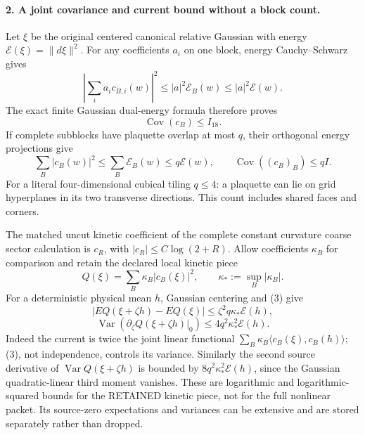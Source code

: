 \documentclass[11pt]{article}
\begin{document}
\paragraph{2. A joint covariance and current bound without a block count.}
Let $\xi$ be the original centered canonical relative Gaussian with
energy $\mathcal E(\xi)=\|d\xi\|^2$. For any coefficients $a_i$ on one
block, energy Cauchy--Schwarz gives
\[
 |\sum_i a_i c_{B,i}(w)|^2
       \le |a|^2\mathcal E_B(w)\le |a|^2\mathcal E(w).
\]
The exact finite Gaussian dual-energy formula therefore proves
\[
 \operatorname{Cov}(c_B)\le I_{18}.                              \tag{2}
\]
If complete subblocks have plaquette overlap at most $q$, their
orthogonal energy projections give
\[
 \sum_B|c_B(w)|^2\le\sum_B\mathcal E_B(w)\le q\mathcal E(w),
 \qquad \operatorname{Cov}((c_B)_B)\le q I.                      \tag{3}
\]
For a literal four-dimensional cubical tiling $q\le4$: a plaquette can
lie on grid hyperplanes in its two transverse directions. This count
includes shared faces and corners.

The matched uncut kinetic coefficient of the complete constant curvature coarse sector calculation is $c_R$, with
$|c_R|\le C\log(2+R)$. Allow coefficients $\kappa_B$ for comparison and retain
the declared local kinetic piece
\[
 Q(\xi)=\sum_B \kappa_B|c_B(\xi)|^2,\qquad
 \kappa_*:=\sup_B|\kappa_B|.
\]
For a deterministic physical mean $h$,
Gaussian centering and (3) give
\[
 |E Q(\xi+\zeta h)-E Q(\xi)|\le \zeta^2 q \kappa_*\mathcal E(h),
\]
\[
 \operatorname{Var}\left(\partial_\zeta Q(\xi+\zeta h)|_0\right)
              \le4q^2\kappa_*^2\mathcal E(h).                         \tag{4}
\]
Indeed the current is twice the joint linear functional
$\sum_B\kappa_B\langle c_B(\xi),c_B(h)\rangle$; (3), not independence,
controls its variance. Similarly the second source derivative of
$\operatorname{Var}Q(\xi+\zeta h)$ is bounded by
$8q^2\kappa_*^2\mathcal E(h)$, since the Gaussian quadratic-linear third
moment vanishes. These are logarithmic and logarithmic-squared bounds
for the RETAINED kinetic piece, not for the full nonlinear packet.
Its source-zero expectations and variances can be extensive and are
stored separately rather than dropped.
\end{document}
